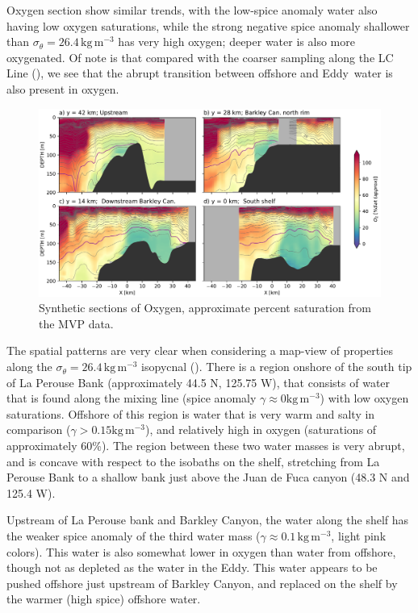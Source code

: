 \documentclass[draft]{agujournal2019}
\newcommand*{\Eddy}{{\sc Eddy}}
\begin{document}
Oxygen section show similar trends, with the low-spice anomaly water also having low oxygen saturations, while the strong negative spice anomaly shallower than $\sigma_{\theta} = 26.4\,\mathrm{kg\,m^{-3}}$ has very high oxygen; deeper water is also more oxygenated.  Of note is that compared with the coarser sampling along the LC Line (), we see that the abrupt transition between offshore and \Eddy\ water is also present in oxygen.

\begin{figure}[htbp]
  \begin{center}
    \includegraphics[width=6.2in]{CrossSectionsO2}
    \caption{Synthetic sections of Oxygen, approximate percent saturation from the MVP data.
      \label{fig:CrossSectionsO2} }
  \end{center}
\end{figure}

The spatial patterns are very clear when considering a map-view of properties along the $\sigma_{\theta} = 26.4\,\mathrm{kg\,m^{-3}}$ isopycnal ().  There is a region onshore of the south tip of La Perouse Bank (approximately 44.5 N, 125.75 W), that consists of water that is found along the mixing line (spice anomaly $\gamma \approx 0 \mathrm{kg\,m^{-3}}$) with low oxygen saturations.  Offshore of this region is water that is very warm and salty in comparison ($\gamma > 0.15 \mathrm{kg\,m^{-3}}$), and relatively high in oxygen (saturations of approximately 60\%).  The region between these two water masses is very abrupt, and is concave with respect to the isobaths on the shelf,  stretching from La Perouse Bank to a shallow bank just above the Juan de Fuca canyon (48.3 N and 125.4 W).

Upstream of La Perouse bank and Barkley Canyon, the water along the shelf has the weaker spice anomaly of the third water mass ($\gamma \approx 0.1\,\mathrm{kg\,m^{-3}}$, light pink colors).  This water is also somewhat lower in oxygen than water from offshore, though not as depleted as the water in the \Eddy.  This water appears to be pushed offshore just upstream of Barkley Canyon, and replaced on the shelf by the warmer (high spice) offshore water.
\end{document}
